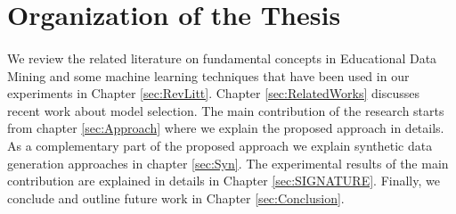 \section{Organization of the Thesis}
\paragraph{} We review the related literature on fundamental concepts in Educational Data Mining and some machine learning techniques that have been used in our experiments in Chapter \ref{sec:RevLitt}. Chapter \ref{sec:RelatedWorks} discusses recent work about model selection. The main contribution of the research starts from chapter \ref{sec:Approach} where we explain the proposed approach in details. As a complementary part of the proposed approach we explain synthetic data generation approaches in chapter \ref{sec:Syn}. The experimental results of the main contribution are explained in details in Chapter \ref{sec:SIGNATURE}. Finally, we conclude and outline future work in Chapter \ref{sec:Conclusion}. 


